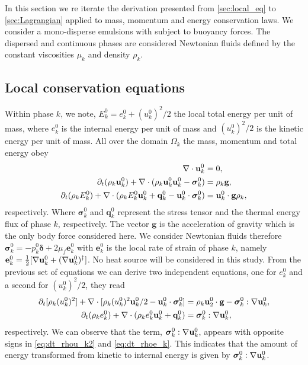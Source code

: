 In this section we re iterate the derivation presented from \ref{sec:local_eq} to \ref{sec:Lagrangian} applied to mass, momentum and energy conservation laws. 
We consider a mono-disperse emulsions with subject to buoyancy forces. 
The dispersed and continuous phases are considered Newtonian ﬂuids deﬁned by the constant viscosities $\mu_k$ and density $\rho_k$.


\subsection{Local conservation equations}

Within phase $k$, we note, $E_k^0 = e_k^0 + (u_k^0)^2/2$ the local total energy per unit of mass, where $e_k^0$ is the internal energy per unit of mass and $(u_k^0)^2/2$ is the kinetic energy per unit of mass.
All over the domain $\Omega_k$ the mass, momentum and total energy obey 
\begin{align}
    \label{eq:dt_rho}
    \mathbf{\nabla}\cdot \textbf{u}_k^0
    &= 
    0,\\
    \label{eq:dt_rhou_k}
    \partial_t (\rho_k\textbf{u}_k^0)  
    + \mathbf{\nabla}\cdot (
        \rho_k\textbf{u}_k^0\textbf{u}_k^0
        - \bm{\sigma}_k^0 
    )
    &= 
    \rho_k \textbf{g},\\
    \label{eq:dt_rhoE_k}
    \partial_t (\rho_kE_k^0)  
    + \mathbf{\nabla}\cdot (
        \rho_kE_k^0\textbf{u}_k^0
        + \textbf{q}_k^0
        - \textbf{u}_k^0 \cdot \bm{\sigma}_k^0 
        )
    &= 
    \textbf{u}_k^0 \cdot \textbf{g}  \rho_k, 
\end{align} 
respectively. 
Where $\bm\sigma_k^0$ and $\textbf{q}_k^0$ represent the stress tensor and the thermal energy flux of phase $k$, respectively. 
The vector $\textbf{g}$ is the acceleration of gravity which is the only body force considered here.
We consider Newtonian fluids therefore $\bm\sigma_k^0 = -p_k^0\bm\delta + 2\mu_f \textbf{e}_k^0$ with $\textbf{e}_k^0$ is the local rate of strain of phase $k$, namely $\textbf{e}_k^0 = \frac{1}{2}[\mathbf{\nabla} \textbf{u}_k^0 + (\mathbf{\nabla} \textbf{u}_k^0)^\dagger]$. 
No heat source will be considered in this study. 
From the previous set of equations we can derive two independent equations, one for $e_k^0$ and a second for $(u_k^0)^2/2$, they read
\begin{align}
    \label{eq:dt_rhou_k2}
    \partial_t [\rho_k(u_k^0)^2]  
    + \mathbf{\nabla}\cdot [\rho_k(u_k^0)^2\textbf{u}_k^0/2 - \textbf{u}_k^0 \cdot \bm{\sigma}_k^0]
    &=
    \rho_k\textbf{u}_2^0 \cdot \textbf{g}  
    -  \bm{\sigma}_k^0 : \mathbf{\nabla} \textbf{u}_k^0,
    \\
    \label{eq:dt_rhoe_k}
    \partial_t (\rho_ke_k^0)  
    + \mathbf{\nabla}\cdot (
        \rho_ke_k^0\textbf{u}_k^0
        + \textbf{q}_k^0
        )
    &= 
    \bm{\sigma}_k^0 : \mathbf{\nabla} \textbf{u}_k^0,
\end{align} 
respectively. 
We can observe that the term, $\bm{\sigma}_k^0 : \mathbf{\nabla} \textbf{u}_k^0$,  appears with opposite signs in \ref{eq:dt_rhou_k2} and \ref{eq:dt_rhoe_k}.
This indicates that the amount of energy transformed from kinetic to internal energy is given by $\bm{\sigma}_k^0 : \mathbf{\nabla} \textbf{u}_k^0$.

